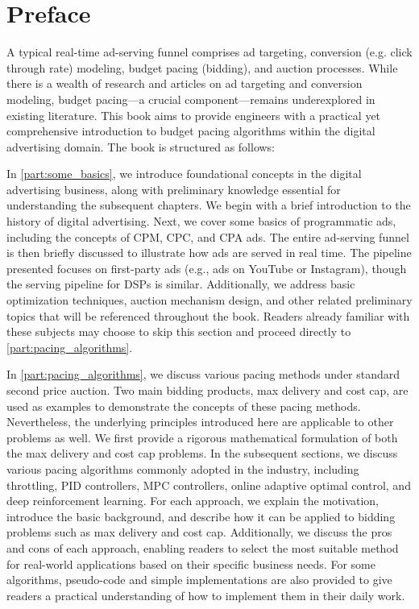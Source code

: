 \documentclass[../Main.tex]{subfiles}
\begin{document}
	\chapter*{Preface}
	 A typical real-time ad-serving funnel comprises ad targeting, conversion (e.g. click through rate) modeling, budget pacing (bidding), and auction processes. While there is a wealth of research and articles on ad targeting and conversion modeling, budget pacing—a crucial component—remains underexplored in existing literature. This book aims to provide engineers with a practical yet comprehensive introduction to budget pacing algorithms within the digital advertising domain. The book is structured as follows:
	
	In \autoref{part:some_basics}, we introduce foundational concepts in the digital advertising business, along with preliminary knowledge essential for understanding the subsequent chapters. We begin with a brief introduction to the history of digital advertising. Next, we cover some basics of programmatic ads, including the concepts of CPM, CPC, and CPA ads. The entire ad-serving funnel is then briefly discussed to illustrate how ads are served in real time. The pipeline presented focuses on first-party ads (e.g., ads on YouTube or Instagram), though the serving pipeline for DSPs is similar. Additionally, we address basic optimization techniques, auction mechanism design, and other related preliminary topics that will be referenced throughout the book. Readers already familiar with these subjects may choose to skip this section and proceed directly to \autoref{part:pacing_algorithms}.
	
	 
	 In \autoref{part:pacing_algorithms}, we discuss various pacing methods under standard second price auction. Two main bidding products, max delivery and cost cap, are used as examples to demonstrate the concepts of these pacing methods. Nevertheless, the underlying principles introduced here are applicable to other problems as well. We first provide a rigorous mathematical formulation of both the max delivery and cost cap problems. In the subsequent sections, we discuss various pacing algorithms commonly adopted in the industry, including throttling, PID controllers, MPC controllers, online adaptive optimal control, and deep reinforcement learning. For each approach, we explain the motivation, introduce the basic background, and describe how it can be applied to bidding problems such as max delivery and cost cap. Additionally, we discuss the pros and cons of each approach, enabling readers to select the most suitable method for real-world applications based on their specific business needs. For some algorithms, pseudo-code and simple implementations are also provided to give readers a practical understanding of how to implement them in their daily work.
	 
\end{document}
